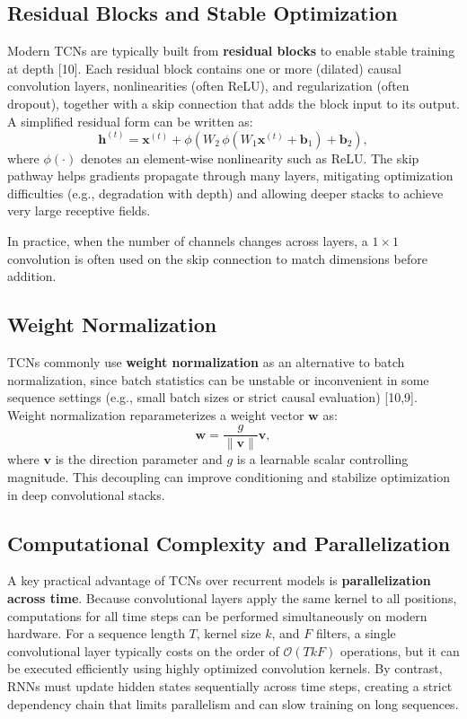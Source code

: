 \documentclass{article}
\renewcommand{\cite}[1]{[#1]}
\begin{document}
\subsection{Residual Blocks and Stable Optimization}

Modern TCNs are typically built from \textbf{residual blocks} to enable stable training at depth \cite{10}. Each residual block contains one or more (dilated) causal convolution layers, nonlinearities (often ReLU), and regularization (often dropout), together with a skip connection that adds the block input to its output. A simplified residual form can be written as:
\[
\mathbf{h}^{(t)} = \mathbf{x}^{(t)} + \phi\!\left(W_2 \, \phi\!\left(W_1 \mathbf{x}^{(t)} + \mathbf{b}_1\right) + \mathbf{b}_2\right),
\]
where $\phi(\cdot)$ denotes an element-wise nonlinearity such as ReLU. The skip pathway helps gradients propagate through many layers, mitigating optimization difficulties (e.g., degradation with depth) and allowing deeper stacks to achieve very large receptive fields.

In practice, when the number of channels changes across layers, a $1 \times 1$ convolution is often used on the skip connection to match dimensions before addition.

\subsection{Weight Normalization}

TCNs commonly use \textbf{weight normalization} as an alternative to batch normalization, since batch statistics can be unstable or inconvenient in some sequence settings (e.g., small batch sizes or strict causal evaluation) \cite{10,9}. Weight normalization reparameterizes a weight vector $\mathbf{w}$ as:
\[
\mathbf{w} = \frac{g}{\|\mathbf{v}\|}\mathbf{v},
\]
where $\mathbf{v}$ is the direction parameter and $g$ is a learnable scalar controlling magnitude. This decoupling can improve conditioning and stabilize optimization in deep convolutional stacks.

\subsection{Computational Complexity and Parallelization}

A key practical advantage of TCNs over recurrent models is \textbf{parallelization across time}. Because convolutional layers apply the same kernel to all positions, computations for all time steps can be performed simultaneously on modern hardware. For a sequence length $T$, kernel size $k$, and $F$ filters, a single convolutional layer typically costs on the order of $\mathcal{O}(T k F)$ operations, but it can be executed efficiently using highly optimized convolution kernels. By contrast, RNNs must update hidden states sequentially across time steps, creating a strict dependency chain that limits parallelism and can slow training on long sequences.
\end{document}
